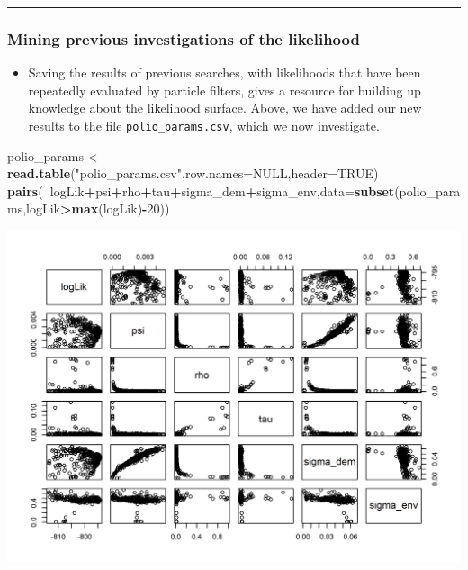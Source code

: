 \documentclass[]{article}
\newenvironment{Shaded}{\begin{snugshade}}{\end{snugshade}}
\newcommand{\KeywordTok}[1]{\textcolor[rgb]{0.13,0.29,0.53}{\textbf{#1}}}
\newcommand{\DataTypeTok}[1]{\textcolor[rgb]{0.13,0.29,0.53}{#1}}
\newcommand{\DecValTok}[1]{\textcolor[rgb]{0.00,0.00,0.81}{#1}}
\newcommand{\StringTok}[1]{\textcolor[rgb]{0.31,0.60,0.02}{#1}}
\newcommand{\OtherTok}[1]{\textcolor[rgb]{0.56,0.35,0.01}{#1}}
\newcommand{\OperatorTok}[1]{\textcolor[rgb]{0.81,0.36,0.00}{\textbf{#1}}}
\newcommand{\NormalTok}[1]{#1}
\providecommand{\tightlist}{%
  \setlength{\itemsep}{0pt}\setlength{\parskip}{0pt}}
\begin{document}
\begin{center}\rule{0.5\linewidth}{\linethickness}\end{center}

\subsubsection{Mining previous investigations of the
likelihood}\label{mining-previous-investigations-of-the-likelihood}

\begin{itemize}
\tightlist
\item
  Saving the results of previous searches, with likelihoods that have
  been repeatedly evaluated by particle filters, gives a resource for
  building up knowledge about the likelihood surface. Above, we have
  added our new results to the file \texttt{polio\_params.csv}, which we
  now investigate.
\end{itemize}

\begin{Shaded}
\begin{Highlighting}[]
\NormalTok{polio_params <-}\StringTok{ }\KeywordTok{read.table}\NormalTok{(}\StringTok{"polio_params.csv"}\NormalTok{,}\DataTypeTok{row.names=}\OtherTok{NULL}\NormalTok{,}\DataTypeTok{header=}\OtherTok{TRUE}\NormalTok{)}
\KeywordTok{pairs}\NormalTok{(}\OperatorTok{~}\NormalTok{logLik}\OperatorTok{+}\NormalTok{psi}\OperatorTok{+}\NormalTok{rho}\OperatorTok{+}\NormalTok{tau}\OperatorTok{+}\NormalTok{sigma_dem}\OperatorTok{+}\NormalTok{sigma_env,}\DataTypeTok{data=}\KeywordTok{subset}\NormalTok{(polio_params,logLik}\OperatorTok{>}\KeywordTok{max}\NormalTok{(logLik)}\OperatorTok{-}\DecValTok{20}\NormalTok{))}
\end{Highlighting}
\end{Shaded}

\begin{center}\includegraphics{figure/sp500-param_file-1} \end{center}
\end{document}
